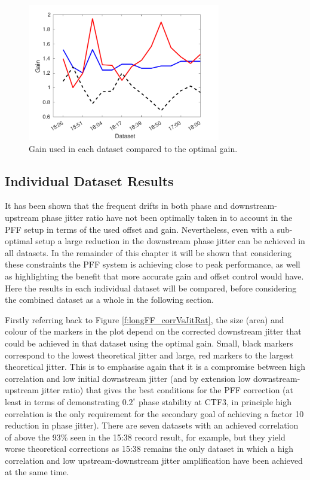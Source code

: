 \begin{figure}
  \centering
  \includegraphics[width=0.75\textwidth]{Figures/feedforward/longFF_gain}
  \caption{Gain used in each dataset compared to the optimal gain.}
  \label{f:longFF_gain}
\end{figure}



\subsection{Individual Dataset Results}
\label{ss:longFF_singleResults}

It has been shown that the frequent drifts in both phase and downstream-upstream phase jitter ratio have not been optimally taken in to account in the PFF setup in terms of the used offset and gain. Nevertheless, even with a sub-optimal setup a large reduction in the downstream phase jitter can be achieved in all datasets. In the remainder of this chapter it will be shown that considering these constraints the PFF system is achieving close to peak performance, as well as highlighting the benefit that more accurate gain and offset control would have. Here the results in each individual dataset will be compared, before considering the combined dataset as a whole in the following section.

Firstly referring back to Figure \ref{f:longFF_corrVsJitRat}, the size (area) and colour of the markers in the plot depend on the corrected downstream jitter that could be achieved in that dataset using the optimal gain. Small, black markers correspond to the lowest theoretical jitter and large, red markers to the largest theoretical jitter. This is to emphasise again that it is a compromise between high correlation and low initial downstream jitter (and by extension low downstream-upstream jitter ratio) that gives the best conditions for the PFF correction (at least in terms of demonstrating \(0.2^\circ\) phase stability at CTF3, in principle high correlation is the only requirement for the secondary goal of achieving a factor 10 reduction in phase jitter). There are seven datasets with an achieved correlation of above the 93\% seen in the 15:38 record result, for example, but they yield worse theoretical corrections as 15:38 remains the only dataset in which a high correlation and low upstream-downstream jitter amplification have been achieved at the same time.

